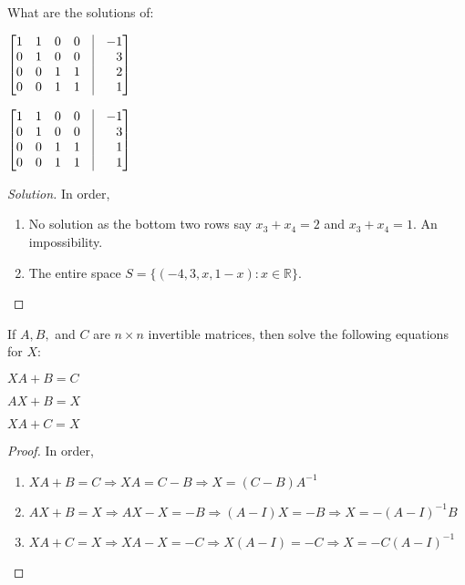 \documentclass[crop=false,class=book]{standalone}
\begin{document}
\begin{problem}
What are the solutions of:
\begin{enumerate}
\begin{multicols}{2}
    \item $\begin{bmatrix*}[r] 1 & 1 & 0 & 0 & \vline & -1 \\ 0 & 1 & 0 & 0 & \vline & 3 \\ 0 & 0 & 1 & 1 & \vline & 2 \\ 0 & 0 & 1 & 1 & \vline & 1 \end{bmatrix*}$
    \item $\begin{bmatrix*}[r] 1 & 1 & 0 & 0 & \vline & -1 \\ 0 & 1 & 0 & 0 & \vline & 3 \\ 0 & 0 & 1 & 1 & \vline & 1 \\ 0 & 0 & 1 & 1 & \vline & 1 \end{bmatrix*}$
\end{multicols}
\end{enumerate}
\end{problem}
\begin{proof}[Solution]
In order,
\begin{enumerate}
    \item No solution as the bottom two rows say $x_3 + x_4 = 2$ and $x_3 + x_4 = 1$. An impossibility.
    \item The entire space $S = \{(-4,3,x,1-x):x\in \mathbb{R}\}$.
\end{enumerate}
\end{proof}
\begin{problem}
If $A,B,$ and $C$ are $n\times n$ invertible matrices, then solve the following equations for $X$:
\begin{enumerate}
\begin{multicols}{3}
    \item $XA+B=C$
    \item $AX+B=X$
    \item $XA+C=X$
\end{multicols}
\end{enumerate}
\end{problem}
\begin{proof}
In order,
\begin{enumerate}
    \item $XA +B=C\Rightarrow XA = C-B \Rightarrow X = (C-B)A^{-1}$
    \item $AX+B = X\Rightarrow AX-X=-B \Rightarrow (A-I)X=-B \Rightarrow X = -(A-I)^{-1}B$
    \item $XA+C = X \Rightarrow XA-X = -C \Rightarrow X(A-I) = -C \Rightarrow X = -C(A-I)^{-1}$
\end{enumerate}
\end{proof}
\end{document}
